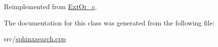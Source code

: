 Reimplemented from \hyperlink{classExtOr__c_ad97e51ec894976af33e6f6518cdaa754}{Ext\-Or\-\_\-c}.



The documentation for this class was generated from the following file\-:\begin{DoxyCompactItemize}
\item 
src/\hyperlink{sphinxsearch_8cpp}{sphinxsearch.\-cpp}\end{DoxyCompactItemize}
